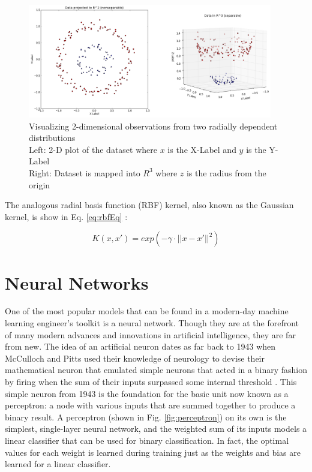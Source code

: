 \begin{figure}[h]
\centering
\captionsetup{justification=centering,width=0.95\textwidth}
\centerline{\includegraphics[width=0.95\textwidth]{radialSeparation.png}}
\caption[Mapping Observations from Radially Dependent Classes]{
    Visualizing 2-dimensional observations from two radially dependent distributions \cite{radialSeparation}\\
    Left: 2-D plot of the dataset where $x$ is the X-Label and $y$ is the Y-Label\\
    Right: Dataset is mapped into $R^{3}$ where $z$ is the radius from the origin
}
\label{fig:radialSeparation}
\end{figure}


The analogous radial basis function (RBF) kernel, also known as the Gaussian kernel, is show in Eq. \ref{eq:rbfEq} \cite{rbfKernel}:


\begin{equation} \label{eq:rbfEq}
K(x, x') = exp(-\gamma \cdot ||x-x'||^{2})
\end{equation}


\section{Neural Networks} \label{nnSection}

One of the most popular models that can be found in a modern-day machine learning engineer's toolkit is a neural network.  Though they are at the forefront of many modern  advances and innovations in artificial intelligence, they are far from new.  The idea of an artificial neuron dates as far back to 1943 when McCulloch and Pitts used their knowledge of neurology to devise their mathematical neuron that emulated simple neurons that acted in a binary fashion by firing when the sum of their inputs surpassed some internal threshold \cite{mccullochPitts}.  This simple neuron from 1943 is the foundation for the basic unit now known as a perceptron: a node with various inputs that are summed together to produce a binary result.  A perceptron (shown in Fig. \ref{fig:perceptron}) on its own is the simplest, single-layer neural network, and the weighted sum of its inputs models a linear classifier that can be used for binary classification.  In fact, the optimal values for each weight is learned during training just as the weights and bias are learned for a linear classifier.


